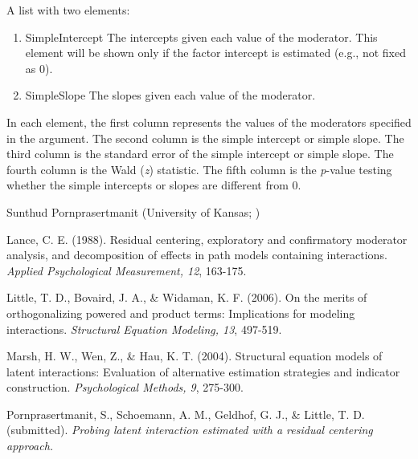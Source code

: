 \documentclass[a4paper]{book}
\begin{document}
\begin{Value}
A list with two elements:
\begin{enumerate}

\item SimpleIntercept The intercepts given each value of the moderator. This element will be shown only if the factor intercept is estimated (e.g., not fixed as 0).
\item SimpleSlope The slopes given each value of the moderator. 

\end{enumerate}

In each element, the first column represents the values of the moderators specified in the  argument. The second column is the simple intercept or simple slope. The third column is the standard error of the simple intercept or simple slope. The fourth column is the Wald (\emph{z}) statistic. The fifth column is the \emph{p}-value testing whether the simple intercepts or slopes are different from 0.
\end{Value}
%
\begin{Author}\relax
Sunthud Pornprasertmanit (University of Kansas; )
\end{Author}
%
\begin{References}\relax

Lance, C. E. (1988). Residual centering, exploratory and confirmatory moderator analysis, and decomposition of effects in path models containing interactions. \emph{Applied Psychological Measurement, 12}, 163-175.

Little, T. D., Bovaird, J. A., \& Widaman, K. F. (2006). On the merits of orthogonalizing powered and product terms: Implications for modeling interactions. \emph{Structural Equation Modeling, 13}, 497-519.

Marsh, H. W., Wen, Z., \& Hau, K. T. (2004). Structural equation models of latent interactions: Evaluation of alternative estimation strategies and indicator construction. \emph{Psychological Methods, 9}, 275-300.

Pornprasertmanit, S., Schoemann, A. M., Geldhof, G. J., \& Little, T. D. (submitted). \emph{Probing latent interaction estimated with a residual centering approach.} 

\end{References}
%
\end{document}
